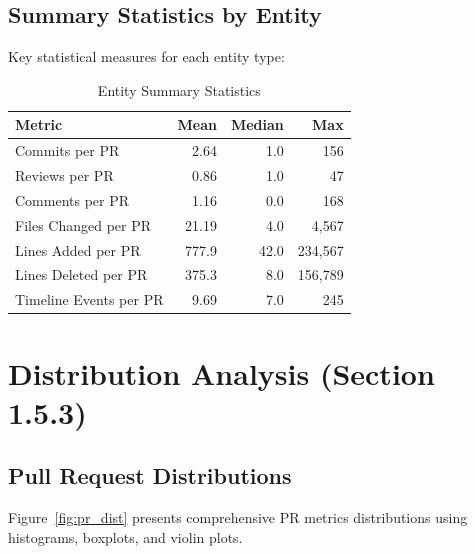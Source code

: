 \documentclass[11pt]{article}
\begin{document}
\subsection{Summary Statistics by Entity}

Key statistical measures for each entity type:

\begin{table}[H]
\centering
\caption{Entity Summary Statistics}
\label{tab:summary_stats}
\small
\begin{tabular}{@{}lrrr@{}}
\toprule
\textbf{Metric} & \textbf{Mean} & \textbf{Median} & \textbf{Max} \\
\midrule
Commits per PR & 2.64 & 1.0 & 156 \\
Reviews per PR & 0.86 & 1.0 & 47 \\
Comments per PR & 1.16 & 0.0 & 168 \\
Files Changed per PR & 21.19 & 4.0 & 4,567 \\
Lines Added per PR & 777.9 & 42.0 & 234,567 \\
Lines Deleted per PR & 375.3 & 8.0 & 156,789 \\
Timeline Events per PR & 9.69 & 7.0 & 245 \\
\bottomrule
\end{tabular}
\end{table}

\section{Distribution Analysis (Section 1.5.3)}

\subsection{Pull Request Distributions}

Figure~\ref{fig:pr_dist} presents comprehensive PR metrics distributions using histograms, boxplots, and violin plots.
\end{document}
